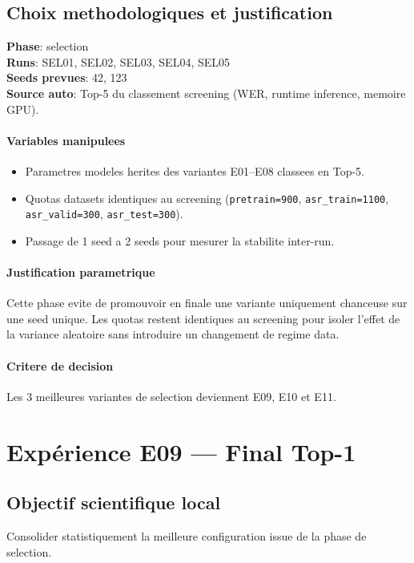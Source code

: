 \documentclass[11pt,a4paper]{article}
\begin{document}
\subsection{Choix methodologiques et justification}
\textbf{Phase}: selection\\
\textbf{Runs}: SEL01, SEL02, SEL03, SEL04, SEL05\\
\textbf{Seeds prevues}: 42, 123\\
\textbf{Source auto}: Top-5 du classement screening (WER, runtime inference, memoire GPU).

\paragraph{Variables manipulees}
\begin{itemize}
\item Parametres modeles herites des variantes E01--E08 classees en Top-5.
\item Quotas datasets identiques au screening (\texttt{pretrain=900}, \texttt{asr\_train=1100}, \texttt{asr\_valid=300}, \texttt{asr\_test=300}).
\item Passage de 1 seed a 2 seeds pour mesurer la stabilite inter-run.
\end{itemize}

\paragraph{Justification parametrique}
Cette phase evite de promouvoir en finale une variante uniquement chanceuse sur une seed unique.
Les quotas restent identiques au screening pour isoler l'effet de la variance aleatoire sans introduire un changement de regime data.

\paragraph{Critere de decision}
Les 3 meilleures variantes de selection deviennent E09, E10 et E11.


\section{Expérience E09 --- Final Top-1}
\subsection{Objectif scientifique local}
Consolider statistiquement la meilleure configuration issue de la phase de selection.
\end{document}
